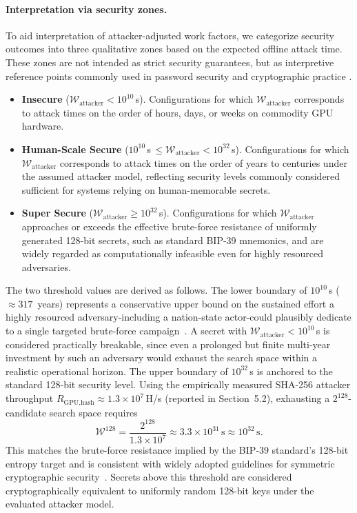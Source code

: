 \documentclass[journal,article,submit,pdftex,moreauthors]{Definitions/mdpi}
\newcommand{\add}[1]{#1}
\newcommand{\add}[1]{\added{#1}}
\begin{document}
\paragraph{Interpretation via security zones.}
To aid interpretation of attacker-adjusted work factors, we categorize security outcomes into three qualitative zones based on the expected offline attack time. These zones are not intended as strict security guarantees, but as interpretive reference points commonly used in password security and cryptographic practice \cite{Bonneau2012a}.
\begin{itemize}
\item \textbf{Insecure} ($\mathcal{W}_{\text{attacker}} < 10^{10}$\,s). Configurations for which $\mathcal{W}_{\text{attacker}}$ corresponds to attack times on the order of hours, days, or weeks on commodity GPU hardware.
\item \textbf{Human-Scale Secure} ($10^{10}$\,s\,$\le \mathcal{W}_{\text{attacker}} < 10^{32}$\,s). Configurations for which $\mathcal{W}_{\text{attacker}}$ corresponds to attack times on the order of years to centuries under the assumed attacker model, reflecting security levels commonly considered sufficient for systems relying on human-memorable secrets.
\item \textbf{Super Secure} ($\mathcal{W}_{\text{attacker}} \ge 10^{32}$\,s). Configurations for which $\mathcal{W}_{\text{attacker}}$ approaches or exceeds the effective brute-force resistance of uniformly generated 128-bit secrets, such as standard BIP-39 mnemonics, and are widely regarded as computationally infeasible even for highly resourced adversaries.
\end{itemize}

\add{The two threshold values are derived as follows. The lower boundary of $10^{10}$\,s ($\approx 317$~years) represents a conservative upper bound on the sustained effort a highly resourced adversary-including a nation-state actor-could plausibly dedicate to a single targeted brute-force campaign~\cite{Bonneau2012a}. A secret with $\mathcal{W}_{\text{attacker}} < 10^{10}$\,s is considered practically breakable, since even a prolonged but finite multi-year investment by such an adversary would exhaust the search space within a realistic operational horizon. The upper boundary of $10^{32}$\,s is anchored to the standard 128-bit security level. Using the empirically measured SHA-256 attacker throughput $R_{\text{GPU,hash}} \approx 1.3 \times 10^{7}$\,H/s (reported in Section~5.2), exhausting a $2^{128}$-candidate search space requires
\begin{equation}
\mathcal{W}^{128} = \frac{2^{128}}{1.3 \times 10^{7}} \approx 3.3 \times 10^{31}\,\text{s} \approx 10^{32}\,\text{s}.
\label{eq:w128_threshold}
\end{equation}
This matches the brute-force resistance implied by the BIP-39 standard's 128-bit entropy target and is consistent with widely adopted guidelines for symmetric cryptographic security~\cite{Bonneau2012a}. Secrets above this threshold are considered cryptographically equivalent to uniformly random 128-bit keys under the evaluated attacker model.}
\end{document}
